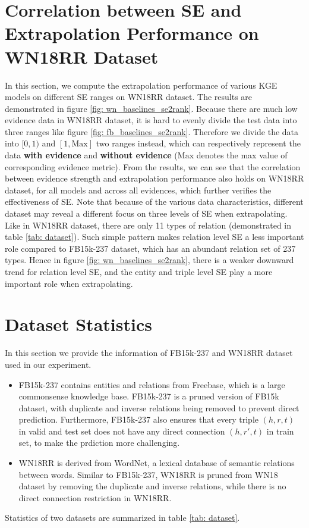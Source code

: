 \documentclass[letterpaper]{article} \usepackage{aaai22}  \usepackage{times}  \usepackage{helvet}  \usepackage{courier}  \usepackage[hyphens]{url}  \usepackage{graphicx} \urlstyle{rm} \def\UrlFont{\rm}  \usepackage{natbib}  \usepackage{caption} \DeclareCaptionStyle{ruled}{labelfont=normalfont,labelsep=colon,strut=off} \frenchspacing  \setlength{\pdfpagewidth}{8.5in}  \setlength{\pdfpageheight}{11in}  \usepackage{algorithm}
\begin{document}
\section{Correlation between SE and Extrapolation Performance on WN18RR Dataset}
\label{ap: wn_baselines_se2rank}
In this section, we compute the extrapolation performance of various KGE models on different SE ranges on WN18RR dataset. The results are demonstrated in figure \ref{fig: wn_baselines_se2rank}. 
Because there are much low evidence data in WN18RR dataset, it is hard to evenly divide the test data into three ranges like figure \ref{fig: fb_baselines_se2rank}. Therefore we divide the data into $[0, 1)$ and $[1, \mathrm{Max}]$ two ranges instead, which can respectively represent the data \textbf{with evidence} and \textbf{without evidence} ($\mathrm{Max}$ denotes the max value of corresponding evidence metric). 
From the results, we can see that the correlation between evidence strength and extrapolation performance also holds on WN18RR dataset, for all models and across all evidences, which further verifies the effectiveness of SE.
Note that because of the various data characteristics, different dataset may reveal a different focus on three levels of SE when extrapolating. 
Like in WN18RR dataset, there are only 11 types of relation (demonstrated in table \ref{tab: dataset}). Such simple pattern makes relation level SE a less important role compared to FB15k-237 dataset, which has an abundant relation set of 237 types. Hence in figure \ref{fig: wn_baselines_se2rank}, there is a weaker downward trend for relation level SE, and the entity and triple level SE play a more important role when extrapolating. 

\section{Dataset Statistics}
\label{ap: dataset}
In this section we provide the information of FB15k-237 and WN18RR dataset used in our experiment.
\begin{itemize}
    \item FB15k-237 \cite{2015_Toutanova_FB15k-237} contains entities and relations from Freebase, which is a large commonsense knowledge base. FB15k-237 is a pruned version of FB15k \cite{NeurIPS_2013_Bordes_TransE} dataset, with duplicate and inverse relations being removed to prevent direct prediction. Furthermore, FB15k-237 also ensures that every triple $(h, r, t)$ in valid and test set does not have any direct connection $(h, r', t)$ in train set, to make the prdiction more challenging. 
    \item WN18RR \cite{AAAI_2018_Dettmers_ConvE_WN18RR} is derived from WordNet, a lexical database of semantic relations between words. Similar to FB15k-237, WN18RR is pruned from WN18 \cite{NeurIPS_2013_Bordes_TransE} dataset by removing the duplicate and inverse relations, while there is no direct connection restriction in WN18RR.
\end{itemize}
Statistics of two datasets are summarized in table \ref{tab: dataset}.
\end{document}
